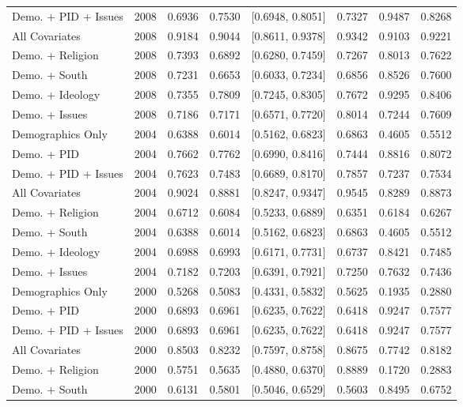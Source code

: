 \begin{longtable}{lrrrlrrr}
  Demo. + PID + Issues & 2008 & 0.6936 & 0.7530 & [0.6948, 0.8051] & 0.7327 & 0.9487 & 0.8268 \\ 
  All Covariates & 2008 & 0.9184 & 0.9044 & [0.8611, 0.9378] & 0.9342 & 0.9103 & 0.9221 \\ 
  Demo. + Religion & 2008 & 0.7393 & 0.6892 & [0.6280, 0.7459] & 0.7267 & 0.8013 & 0.7622 \\ 
  Demo. + South & 2008 & 0.7231 & 0.6653 & [0.6033, 0.7234] & 0.6856 & 0.8526 & 0.7600 \\ 
  Demo. + Ideology & 2008 & 0.7355 & 0.7809 & [0.7245, 0.8305] & 0.7672 & 0.9295 & 0.8406 \\ 
  Demo. + Issues & 2008 & 0.7186 & 0.7171 & [0.6571, 0.7720] & 0.8014 & 0.7244 & 0.7609 \\ 
  Demographics Only & 2004 & 0.6388 & 0.6014 & [0.5162, 0.6823] & 0.6863 & 0.4605 & 0.5512 \\ 
  Demo. + PID & 2004 & 0.7662 & 0.7762 & [0.6990, 0.8416] & 0.7444 & 0.8816 & 0.8072 \\ 
  Demo. + PID + Issues & 2004 & 0.7623 & 0.7483 & [0.6689, 0.8170] & 0.7857 & 0.7237 & 0.7534 \\ 
  All Covariates & 2004 & 0.9024 & 0.8881 & [0.8247, 0.9347] & 0.9545 & 0.8289 & 0.8873 \\ 
  Demo. + Religion & 2004 & 0.6712 & 0.6084 & [0.5233, 0.6889] & 0.6351 & 0.6184 & 0.6267 \\ 
  Demo. + South & 2004 & 0.6388 & 0.6014 & [0.5162, 0.6823] & 0.6863 & 0.4605 & 0.5512 \\ 
  Demo. + Ideology & 2004 & 0.6988 & 0.6993 & [0.6171, 0.7731] & 0.6737 & 0.8421 & 0.7485 \\ 
  Demo. + Issues & 2004 & 0.7182 & 0.7203 & [0.6391, 0.7921] & 0.7250 & 0.7632 & 0.7436 \\ 
  Demographics Only & 2000 & 0.5268 & 0.5083 & [0.4331, 0.5832] & 0.5625 & 0.1935 & 0.2880 \\ 
  Demo. + PID & 2000 & 0.6893 & 0.6961 & [0.6235, 0.7622] & 0.6418 & 0.9247 & 0.7577 \\ 
  Demo. + PID + Issues & 2000 & 0.6893 & 0.6961 & [0.6235, 0.7622] & 0.6418 & 0.9247 & 0.7577 \\ 
  All Covariates & 2000 & 0.8503 & 0.8232 & [0.7597, 0.8758] & 0.8675 & 0.7742 & 0.8182 \\ 
  Demo. + Religion & 2000 & 0.5751 & 0.5635 & [0.4880, 0.6370] & 0.8889 & 0.1720 & 0.2883 \\ 
  Demo. + South & 2000 & 0.6131 & 0.5801 & [0.5046, 0.6529] & 0.5603 & 0.8495 & 0.6752 \\ 

\end{longtable}
